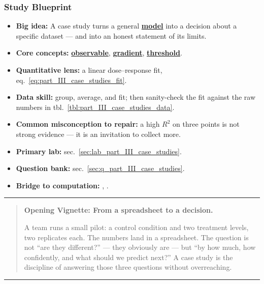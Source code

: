 \documentclass[
]{article}
\providecommand{\tightlist}{%
  \setlength{\itemsep}{0pt}\setlength{\parskip}{0pt}}
\theoremstyle{plain}
\theoremstyle{definition}
\begin{document}
\subsubsection{Study Blueprint}\label{study-blueprint-10}

\begin{itemize}
\tightlist
\item
  \textbf{Big idea:} A case study turns a general
  \hyperref[gl:model]{\textbf{model}} into a decision about a specific
  dataset --- and into an honest statement of its limits.
\item
  \textbf{Core concepts:} \hyperref[gl:observable]{\textbf{observable}},
  \hyperref[gl:gradient]{\textbf{gradient}},
  \hyperref[gl:threshold]{\textbf{threshold}}.
\item
  \textbf{Quantitative lens:} a linear dose--response fit,
  eq.~\ref{eq:part_III_case_studies_fit}.
\item
  \textbf{Data skill:} group, average, and fit; then sanity-check the
  fit against the raw numbers in
  tbl.~\ref{tbl:part_III_case_studies_data}.
\item
  \textbf{Common misconception to repair:} a high \(R^2\) on three
  points is not strong evidence --- it is an invitation to collect more.
\item
  \textbf{Primary lab:} sec.~\ref{sec:lab_part_III_case_studies}.
\item
  \textbf{Question bank:} sec.~\ref{sec:q_part_III_case_studies}.
\item
  \textbf{Bridge to computation:} ,
  .
\end{itemize}

\begin{center}\rule{0.5\linewidth}{0.5pt}\end{center}

\begin{quote}
\textbf{Opening Vignette: From a spreadsheet to a decision.}

A team runs a small pilot: a control condition and two treatment levels,
two replicates each. The numbers land in a spreadsheet. The question is
not ``are they different?'' --- they obviously are --- but ``by how
much, how confidently, and what should we predict next?'' A case study
is the discipline of answering those three questions without
overreaching.
\end{quote}

\begin{center}\rule{0.5\linewidth}{0.5pt}\end{center}
\end{document}
